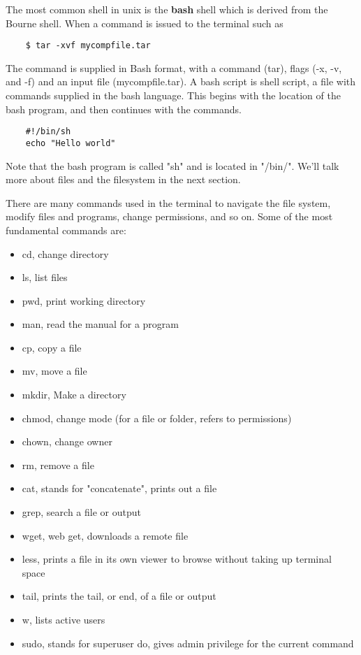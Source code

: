 \documentclass{article}
\begin{document}
	The most common shell in unix is the \textbf{bash} shell which is derived from the Bourne shell. When a command is issued to the terminal such as
	\begin{lstlisting}
	$ tar -xvf mycompfile.tar
	\end{lstlisting}
	The command is supplied in Bash format, with a command (tar), flags (-x, -v, and -f) and an input file (mycompfile.tar). A bash script is shell script, a file with commands supplied in the bash language. This begins with the location of the bash program, and then continues with the commands.
	\begin{lstlisting}
	#!/bin/sh
	echo "Hello world"
	\end{lstlisting}
	
	Note that the bash program is called "sh" and is located in "/bin/". We'll talk more about files and the filesystem in the next section. 
	
	There are many commands used in the terminal to navigate the file system, modify files and programs, change permissions, and so on. Some of the most fundamental commands are:
	\begin{itemize}
	\item cd, change directory
	\item ls, list files
	\item pwd, print working directory
	\item man, read the manual for a program
	\item cp, copy a file
	\item mv, move a file
	\item mkdir, Make a directory
	\item chmod, change mode (for a file or folder, refers to permissions)
	\item chown, change owner
	\item rm, remove a file
	\item cat, stands for "concatenate", prints out a file
	\item grep, search a file or output
	\item wget, web get, downloads a remote file
	\item less, prints a file in its own viewer to browse without taking up terminal space
	\item tail, prints the tail, or end, of a file or output
	\item w, lists active users
	\item sudo, stands for superuser do, gives admin privilege for the current command
	\end{itemize}
	
\end{document}
